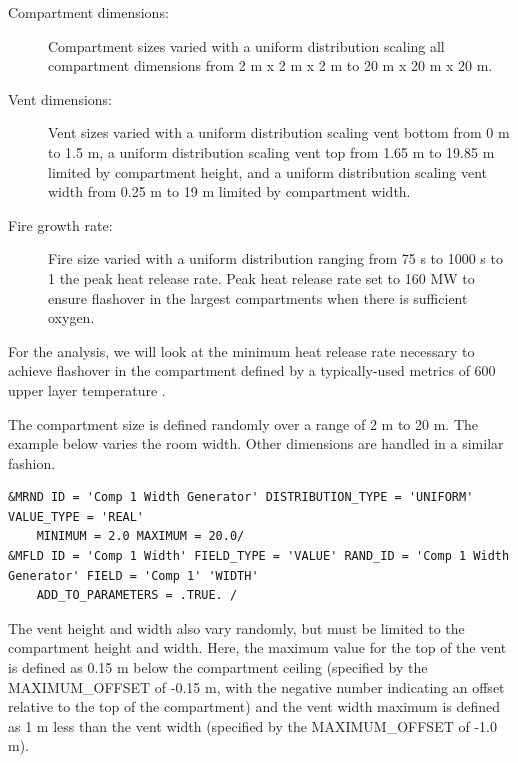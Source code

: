 \documentclass[12pt,twoside]{book}
\begin{document}
\begin{description}
\item[Compartment dimensions:] Compartment sizes varied with a uniform distribution scaling all compartment dimensions from 2 m x 2 m x 2 m to 20 m x 20 m x 20 m.
\item[Vent dimensions:] Vent sizes varied with a uniform distribution scaling vent bottom from 0 m to 1.5 m, a uniform distribution scaling vent top from 1.65 m to 19.85 m limited by compartment height, and a uniform distribution scaling vent width from 0.25 m to 19 m limited by compartment width.
\item[Fire growth rate:] Fire size varied with a uniform distribution ranging from 75 s to 1000 s to 1 the peak heat release rate. Peak heat release rate set to 160 MW to ensure flashover in the largest compartments when there is sufficient oxygen.
\end{description}

For the analysis, we will look at the minimum heat release rate necessary to achieve flashover in the compartment defined by a typically-used metrics of 600 \degc upper layer temperature \cite{Valid:Peacock_Flashover_1} \cite{Valid:Peacock_Flashover_2}.

The compartment size is defined randomly over a range of 2 m to 20 m. The example below varies the room width. Other dimensions are handled in a similar fashion.

\vspace{\baselineskip}
\begin{lstlisting}
&MRND ID = 'Comp 1 Width Generator' DISTRIBUTION_TYPE = 'UNIFORM' VALUE_TYPE = 'REAL'
    MINIMUM = 2.0 MAXIMUM = 20.0/
&MFLD ID = 'Comp 1 Width' FIELD_TYPE = 'VALUE' RAND_ID = 'Comp 1 Width Generator' FIELD = 'Comp 1' 'WIDTH'
    ADD_TO_PARAMETERS = .TRUE. /
\end{lstlisting}

The vent height and width also vary randomly, but must be limited to the compartment height and width. Here, the maximum value for the top of the vent is defined as 0.15 m below the compartment ceiling (specified by the {\ct MAXIMUM\_OFFSET} of -0.15 m, with the negative number indicating an offset relative to the top of the compartment) and the vent width maximum is defined as 1 m less than the vent width (specified by the {\ct MAXIMUM\_OFFSET} of -1.0 m).
\end{document}
